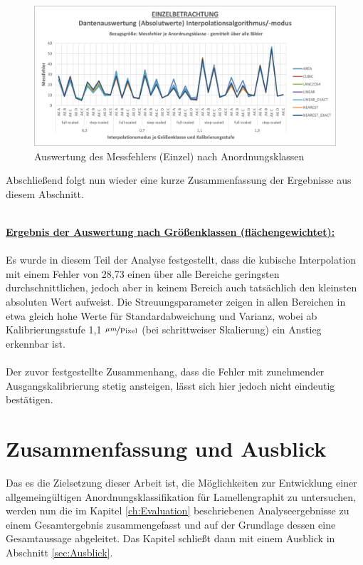 \documentclass[
fontsize=10pt, 
listof = totoc,
parskip = half	
]{report}
\begin{document}
\begin{figure}[H]
	\centering
	\includegraphics[width=\textwidth, height=\textheight, keepaspectratio]{pics/DA_Einzel_Absolut_AKL}
	\caption{Auswertung des Messfehlers (Einzel) nach Anordnungsklassen}
	\label{fig:DAEinzelAbsolutAKL}
\end{figure}

\noindent Abschließend folgt nun wieder eine kurze Zusammenfassung der Ergebnisse aus diesem Abschnitt.
\\\\
\colorbox{gray!10}{
	\label{box:Ergebnis der Auswertung nach Größenklassen (flächengewichtet):}
	\begin{minipage}{0.975\textwidth}
		\textbf{\underline{Ergebnis der Auswertung nach Größenklassen (flächengewichtet):}}
		\\\\
		Es wurde in diesem Teil der Analyse festgestellt, dass die kubische Interpolation mit einem  Fehler von 28,73 einen über alle Bereiche geringsten durchschnittlichen, jedoch aber in keinem Bereich auch tatsächlich den kleinsten absoluten Wert aufweist. Die Streuungsparameter zeigen in allen Bereichen  in etwa gleich hohe Werte für Standardabweichung und Varianz, wobei ab Kalibrierungsstufe 1,1 $\nicefrac{\mu m}{\text{Pixel}}$ (bei schrittweiser Skalierung) ein Anstieg erkennbar ist.
		\\\\
		Der zuvor festgestellte Zusammenhang, dass die Fehler mit zunehmender Ausgangskalibrierung stetig ansteigen, lässt sich hier jedoch nicht eindeutig bestätigen.
	\end{minipage}
}

\chapter{Zusammenfassung und Ausblick}

Das es die Zielsetzung dieser Arbeit ist, die Möglichkeiten zur Entwicklung einer allgemeingültigen Anordnungsklassifikation für Lamellengraphit zu untersuchen, werden nun die im Kapitel \ref{ch:Evaluation} beschriebenen Analyseergebnisse zu einem Gesamtergebnis zusammengefasst und auf der Grundlage dessen eine Gesamtaussage abgeleitet. Das Kapitel schließt dann mit einem Ausblick in Abschnitt \ref{sec:Ausblick}.
\end{document}
